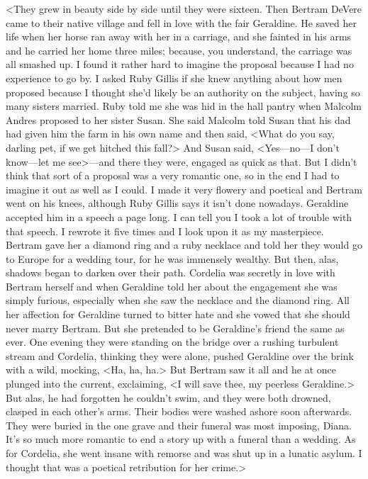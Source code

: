 <They grew in beauty side by side until they were sixteen. Then Bertram DeVere came to their native village and fell in love with the fair Geraldine. He saved her life when her horse ran away with her in a carriage, and she fainted in his arms and he carried her home three miles; because, you understand, the carriage was all smashed up. I found it rather hard to imagine the proposal because I had no experience to go by. I asked Ruby Gillis if she knew anything about how men proposed because I thought she'd likely be an authority on the subject, having so many sisters married. Ruby told me she was hid in the hall pantry when Malcolm Andres proposed to her sister Susan. She said Malcolm told Susan that his dad had given him the farm in his own name and then said, <What do you say, darling pet, if we get hitched this fall?> And Susan said, <Yes—no—I don't know—let me see>—and there they were, engaged as quick as that. But I didn't think that sort of a proposal was a very romantic one, so in the end I had to imagine it out as well as I could. I made it very flowery and poetical and Bertram went on his knees, although Ruby Gillis says it isn't done nowadays. Geraldine accepted him in a speech a page long. I can tell you I took a lot of trouble with that speech. I rewrote it five times and I look upon it as my masterpiece. Bertram gave her a diamond ring and a ruby necklace and told her they would go to Europe for a wedding tour, for he was immensely wealthy. But then, alas, shadows began to darken over their path. Cordelia was secretly in love with Bertram herself and when Geraldine told her about the engagement she was simply furious, especially when she saw the necklace and the diamond ring. All her affection for Geraldine turned to bitter hate and she vowed that she should never marry Bertram. But she pretended to be Geraldine's friend the same as ever. One evening they were standing on the bridge over a rushing turbulent stream and Cordelia, thinking they were alone, pushed Geraldine over the brink with a wild, mocking, <Ha, ha, ha.> But Bertram saw it all and he at once plunged into the current, exclaiming, <I will save thee, my peerless Geraldine.> But alas, he had forgotten he couldn't swim, and they were both drowned, clasped in each other's arms. Their bodies were washed ashore soon afterwards. They were buried in the one grave and their funeral was most imposing, Diana. It's so much more romantic to end a story up with a funeral than a wedding. As for Cordelia, she went insane with remorse and was shut up in a lunatic asylum. I thought that was a poetical retribution for her crime.>

